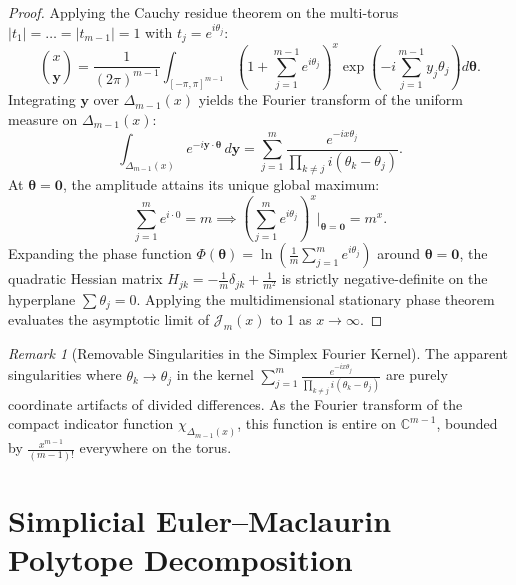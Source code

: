 \documentclass[11pt,a4paper]{article}
\theoremstyle{plain}
\theoremstyle{definition}
\theoremstyle{remark}
\newtheorem{remark}[theorem]{Remark}
\numberwithin{equation}{section}
\begin{document}
\begin{proof}
Applying the Cauchy residue theorem on the multi-torus $|t_1| = \dots = |t_{m-1}| = 1$ with $t_j = e^{i\theta_j}$:
\begin{equation}
\binom{x}{\mathbf{y}} = \frac{1}{(2\pi)^{m-1}}\int_{[-\pi, \pi]^{m-1}} \left(1 + \sum_{j=1}^{m-1}e^{i\theta_j}\right)^x \exp\left(-i\sum_{j=1}^{m-1}y_j\theta_j\right)d\boldsymbol{\theta}.
\end{equation}
Integrating $\mathbf{y}$ over $\Delta_{m-1}(x)$ yields the Fourier transform of the uniform measure on $\Delta_{m-1}(x)$:
\begin{equation}
\int_{\Delta_{m-1}(x)} e^{-i\mathbf{y}\cdot\boldsymbol{\theta}}\,d\mathbf{y} = \sum_{j=1}^m \frac{e^{-ix\theta_j}}{\prod_{k \ne j} i(\theta_k - \theta_j)}.
\end{equation}
At $\boldsymbol{\theta} = \mathbf{0}$, the amplitude attains its unique global maximum:
\begin{equation}
\sum_{j=1}^m e^{i\cdot 0} = m \implies \left(\sum_{j=1}^m e^{i\theta_j}\right)^x \Big|_{\boldsymbol{\theta}=\mathbf{0}} = m^x.
\end{equation}
Expanding the phase function $\Phi(\boldsymbol{\theta}) = \ln\left(\frac{1}{m}\sum_{j=1}^m e^{i\theta_j}\right)$ around $\boldsymbol{\theta} = \mathbf{0}$, the quadratic Hessian matrix $H_{jk} = -\frac{1}{m}\delta_{jk} + \frac{1}{m^2}$ is strictly negative-definite on the hyperplane $\sum \theta_j = 0$. Applying the multidimensional stationary phase theorem \cite{wong2001} evaluates the asymptotic limit of $\mathcal{J}_m(x)$ to 1 as $x \to \infty$.
\end{proof}

\begin{remark}[Removable Singularities in the Simplex Fourier Kernel]
The apparent singularities where $\theta_k \to \theta_j$ in the kernel $\sum_{j=1}^m \frac{e^{-ix\theta_j}}{\prod_{k \ne j} i(\theta_k - \theta_j)}$ are purely coordinate artifacts of divided differences. As the Fourier transform of the compact indicator function $\chi_{\Delta_{m-1}(x)}$, this function is entire on $\mathbb{C}^{m-1}$, bounded by $\frac{x^{m-1}}{(m-1)!}$ everywhere on the torus.
\end{remark}

\section{Simplicial Euler--Maclaurin Polytope Decomposition}
\end{document}
